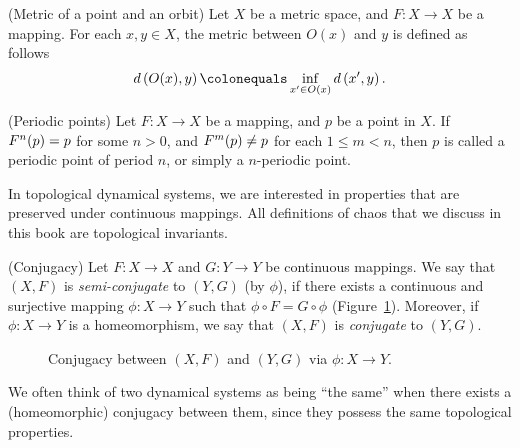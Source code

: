 \documentclass[10pt,twoside,draft]{book}
\begin{document}
\begin{definition}
  (Metric of a point and an orbit)
  Let $X$ be a metric space, and $F: X \to X$ be a mapping.
  For each $x,y \in X$, the metric between $O(x)$ and $y$ is defined as follows
  \begin{equation*}
    \metric{O(x),y} \ceq \inf\limits_{x' \in O(x)} \metric{x',y}.
  \end{equation*}
\end{definition}
\begin{definition}
  (Periodic points)
  Let $F: X \to X$ be a mapping, and $p$ be a point in $X$.
  If $F^{n}(p) = p$ for some $n > 0$, and $F^{m}(p) \neq p$ for each $1 \leq m < n$, then $p$ is called a periodic point of period $n$, or simply a $n$-periodic point.
  \label{def:porbit}
\end{definition}

In topological dynamical systems, we are interested in properties that are preserved under continuous mappings.
All definitions of chaos that we discuss in this book are topological invariants.
\begin{definition}
  (Conjugacy)
  Let $F: X \to X$ and $G: Y \to Y$ be continuous mappings.
  We say that $(X,F)$ is \textit{semi-conjugate} to $(Y,G)$ (by $\phi$), if there exists a continuous and surjective mapping $\phi: X \to Y$ such that $\phi\circ F = G\circ\phi$ (Figure~\ref{fig:conj}).
  Moreover, if $\phi: X \to Y$ is a homeomorphism, we say that $(X,F)$ is \textit{conjugate} to $(Y,G)$.
\end{definition}
\begin{figure}[ht]
  \centering
  \caption{Conjugacy between $(X,F)$ and $(Y,G)$ via $\phi: X \to Y$.}
  \label{fig:conj}
\end{figure}
We often think of two dynamical systems as being ``the same'' when there exists a (homeomorphic) conjugacy between them, since they possess the same topological properties.




\printindex
\end{document}
